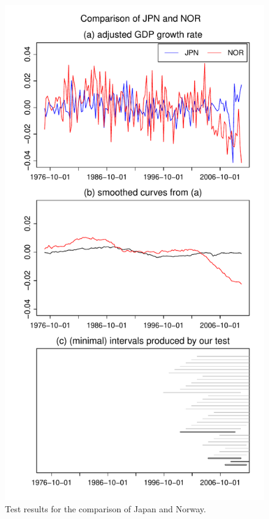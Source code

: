 \documentclass[a4paper,12pt]{article}
\begin{document}
\begin{figure}[p!]
\begin{minipage}[t]{0.49\textwidth}
\includegraphics[width=\textwidth]{Plots/JPN_vs_NOR}
\caption{Test results for the comparison of Japan and Norway.}\label{fig:Japan:Norway}
\end{minipage}
\hspace{0.25cm}

\end{figure}
\end{document}
